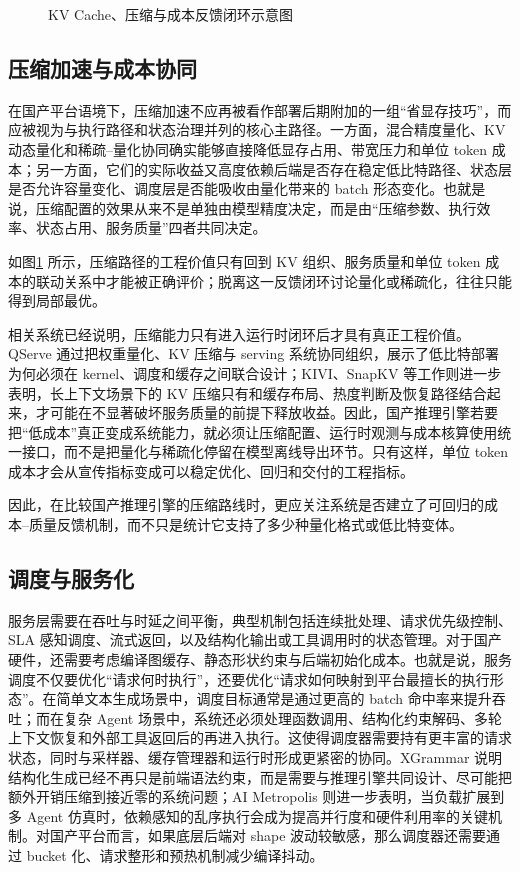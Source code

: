 \begin{figure}[t]
\centering
\resizebox{0.88\linewidth}{!}{}
\caption{KV Cache、压缩与成本反馈闭环示意图}
\label{fig:kv-cost-feedback-loop}
\end{figure}

\subsection{压缩加速与成本协同}

在国产平台语境下，压缩加速不应再被看作部署后期附加的一组“省显存技巧”，而应被视为与执行路径和状态治理并列的核心主路径。一方面，混合精度量化、KV 动态量化和稀疏--量化协同确实能够直接降低显存占用、带宽压力和单位 token 成本；另一方面，它们的实际收益又高度依赖后端是否存在稳定低比特路径、状态层是否允许容量变化、调度层是否能吸收由量化带来的 batch 形态变化。也就是说，压缩配置的效果从来不是单独由模型精度决定，而是由“压缩参数、执行效率、状态占用、服务质量”四者共同决定。

如图\ref{fig:kv-cost-feedback-loop} 所示，压缩路径的工程价值只有回到 KV 组织、服务质量和单位 token 成本的联动关系中才能被正确评价；脱离这一反馈闭环讨论量化或稀疏化，往往只能得到局部最优。

相关系统已经说明，压缩能力只有进入运行时闭环后才具有真正工程价值。QServe 通过把权重量化、KV 压缩与 serving 系统协同组织，展示了低比特部署为何必须在 kernel、调度和缓存之间联合设计\citep{wang2024qserve}；KIVI、SnapKV 等工作则进一步表明，长上下文场景下的 KV 压缩只有和缓存布局、热度判断及恢复路径结合起来，才可能在不显著破坏服务质量的前提下释放收益\citep{liu2024kivi,li2024snapkv}。因此，国产推理引擎若要把“低成本”真正变成系统能力，就必须让压缩配置、运行时观测与成本核算使用统一接口，而不是把量化与稀疏化停留在模型离线导出环节。只有这样，单位 token 成本才会从宣传指标变成可以稳定优化、回归和交付的工程指标。

因此，在比较国产推理引擎的压缩路线时，更应关注系统是否建立了可回归的成本--质量反馈机制，而不只是统计它支持了多少种量化格式或低比特变体。

\subsection{调度与服务化}

服务层需要在吞吐与时延之间平衡，典型机制包括连续批处理、请求优先级控制、SLA 感知调度、流式返回，以及结构化输出或工具调用时的状态管理。对于国产硬件，还需要考虑编译图缓存、静态形状约束与后端初始化成本。也就是说，服务调度不仅要优化“请求何时执行”，还要优化“请求如何映射到平台最擅长的执行形态”。在简单文本生成场景中，调度目标通常是通过更高的 batch 命中率来提升吞吐；而在复杂 Agent 场景中，系统还必须处理函数调用、结构化约束解码、多轮上下文恢复和外部工具返回后的再进入执行。这使得调度器需要持有更丰富的请求状态，同时与采样器、缓存管理器和运行时形成更紧密的协同。XGrammar 说明结构化生成已经不再只是前端语法约束，而是需要与推理引擎共同设计、尽可能把额外开销压缩到接近零的系统问题\citep{dong2024xgrammar}；AI Metropolis 则进一步表明，当负载扩展到多 Agent 仿真时，依赖感知的乱序执行会成为提高并行度和硬件利用率的关键机制\citep{xie2025aimetropolis}。对国产平台而言，如果底层后端对 shape 波动较敏感，那么调度器还需要通过 bucket 化、请求整形和预热机制减少编译抖动。

